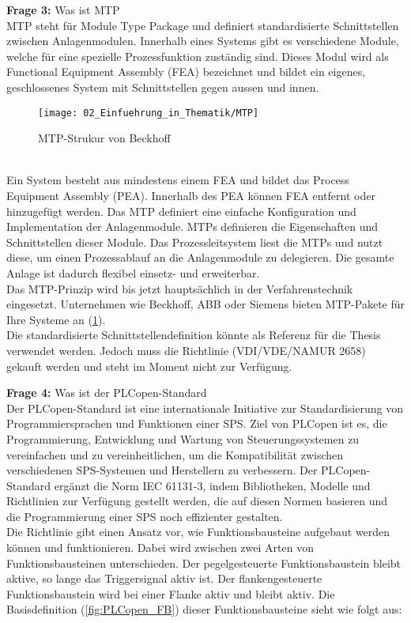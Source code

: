 	\newpage
	
	\textbf{Frage 3:} Was ist MTP \vspace{2mm} 
	\\
	MTP steht für Module Type Package und definiert standardisierte Schnittstellen zwischen Anlagenmodulen. Innerhalb eines Systems gibt es verschiedene Module, welche für eine spezielle Prozessfunktion zuständig sind. Dieses Modul wird als Functional Equipment Assembly (FEA) bezeichnet und bildet ein eigenes, geschlossenes System mit Schnittstellen gegen aussen und innen.
	\\
	\begin{figure}[h!]
		\centering
		\texttt{[image: 02\_Einfuehrung\_in\_Thematik/MTP]}
		\captionsetup{justification=centering}
		\caption{MTP-Strukur von Beckhoff}
		\label{fig:MTP}
	\end{figure}
	\\
	Ein System besteht aus mindestens einem FEA und bildet das Process Equipment Assembly (PEA). Innerhalb des PEA können FEA entfernt oder hinzugefügt werden. Das MTP definiert eine einfache Konfiguration und Implementation der Anlagenmodule. MTPs definieren die Eigenschaften und Schnittstellen dieser Module. Das Prozessleitsystem liest die MTPs und nutzt diese, um einen Prozessablauf an die Anlagenmodule zu delegieren. Die gesamte Anlage ist dadurch flexibel einsetz- und erweiterbar.
	\\  
	Das MTP-Prinzip wird bis jetzt hauptsächlich in der Verfahrenstechnik eingesetzt. Unternehmen wie Beckhoff, ABB oder Siemens bieten MTP-Pakete für Ihre Systeme an (\ref{fig:MTP}). 
	\\
	Die standardisierte Schnittstellendefinition könnte als Referenz für die Thesis verwendet werden. Jedoch muss die Richtlinie (VDI/VDE/NAMUR 2658) gekauft werden und steht im Moment nicht zur Verfügung. 
	\vspace{3mm}
	
	\textbf{Frage 4:} Was ist der PLCopen-Standard  \vspace{2mm} 
	\\
	Der PLCopen-Standard ist eine internationale Initiative zur Standardisierung von Programmiersprachen und Funktionen einer SPS. Ziel von PLCopen ist es, die Programmierung, Entwicklung und Wartung von Steuerungssystemen zu vereinfachen und zu vereinheitlichen, um die Kompatibilität zwischen verschiedenen SPS-Systemen und Herstellern zu verbessern. Der PLCopen-Standard ergänzt die Norm IEC 61131-3, indem Bibliotheken, Modelle und Richtlinien zur Verfügung gestellt werden, die auf diesen Normen basieren und die Programmierung einer SPS noch effizienter gestalten.
	\\
	Die Richtlinie gibt einen Ansatz vor, wie Funktionsbausteine aufgebaut werden können und funktionieren. Dabei wird zwischen zwei Arten von Funktionsbausteinen unterschieden. Der pegelgesteuerte Funktionsbaustein bleibt aktive, so lange das Triggersignal aktiv ist. Der flankengesteuerte Funktionsbaustein wird bei einer Flanke aktiv und bleibt aktiv. Die Basisdefinition (\ref{fig:PLCopen_FB}) dieser Funktionsbausteine sieht wie folgt aus: 
	
